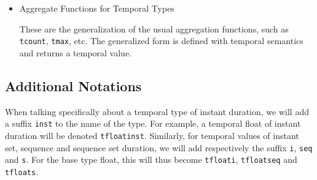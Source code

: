 \begin{itemize}
    \item Aggregate Functions for Temporal Types

        These are the generalization of the usual aggregation functions, such as \lstinline{tcount}, \lstinline{tmax}, etc. The generalized form is defined with temporal semantics and returns a temporal value.

\end{itemize}

\subsection{Additional Notations}
\label{section:mobilitydb_notations}

When talking specifically about a temporal type of instant duration, we will add a suffix \lstinline{inst} to the name of the type. For example, a temporal float of instant duration will be denoted \lstinline{tfloatinst}. 
Similarly, for temporal values of instant set, sequence and sequence set duration, we will add respectively the suffix \lstinline{i}, \lstinline{seq} and \lstinline{s}. For the base type float, this will thus become \lstinline{tfloati}, \lstinline{tfloatseq} and \lstinline{tfloats}.